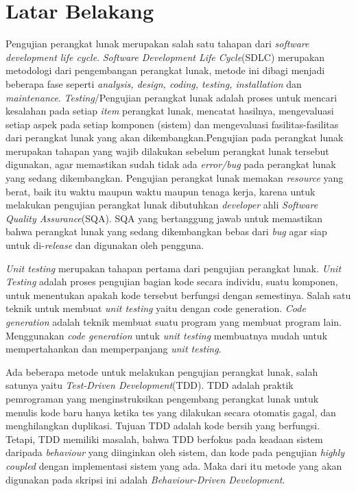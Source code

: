 \documentclass[a4paper,twoside]{article}
\begin{document}
\section{Latar Belakang}
Pengujian perangkat lunak merupakan salah satu tahapan dari \textit{software development life cycle}. \textit{Software Development Life Cycle}(SDLC) merupakan metodologi dari pengembangan perangkat lunak, metode ini dibagi menjadi beberapa fase seperti\textit{ analysis, design,  coding,  testing, installation} dan \textit{maintenance}. \textit{Testing}/Pengujian perangkat lunak adalah proses untuk mencari kesalahan pada setiap \textit{item} perangkat lunak, mencatat hasilnya, mengevaluasi setiap aspek pada setiap komponen (sistem) dan mengevaluasi fasilitas-fasilitas dari perangkat lunak yang akan dikembangkan.Pengujian pada perangkat lunak merupakan tahapan yang wajib dilakukan sebelum perangkat lunak tersebut digunakan, agar memastikan sudah tidak ada \textit{error/bug} pada perangkat lunak yang sedang dikembangkan. Pengujian perangkat lunak memakan \textit{resource} yang berat, baik itu waktu maupun waktu maupun tenaga kerja, karena untuk melakukan pengujian perangkat lunak dibutuhkan \textit{developer} ahli \textit{Software Quality Assurance}(SQA). SQA yang bertanggung jawab untuk memastikan bahwa perangkat lunak yang sedang dikembangkan bebas dari \textit{bug} agar siap untuk di-\textit{release} dan digunakan oleh pengguna.

\textit{Unit testing} merupakan tahapan pertama dari pengujian perangkat lunak. \textit{Unit Testing} adalah proses pengujian bagian kode secara individu, suatu komponen, untuk menentukan apakah kode tersebut berfungsi dengan semestinya. Salah satu teknik untuk membuat \textit{unit testing} yaitu dengan code generation. \textit{Code generation} adalah teknik membuat suatu program yang membuat program lain. Menggunakan \textit{code generation} untuk \textit{unit testing} membuatnya mudah untuk mempertahankan dan memperpanjang \textit{unit testing}.

Ada beberapa metode untuk melakukan pengujian perangkat lunak, salah satunya yaitu \textit{Test-Driven Development}(TDD). TDD adalah praktik pemrograman yang menginstruksikan pengembang perangkat lunak untuk menulis kode baru hanya ketika tes yang dilakukan secara otomatis gagal, dan menghilangkan duplikasi. Tujuan TDD adalah kode bersih yang berfungsi. Tetapi, TDD memiliki masalah, bahwa TDD berfokus pada keadaan sistem daripada \textit{behaviour} yang diinginkan oleh sistem, dan kode pada pengujian \textit{highly coupled} dengan implementasi sistem yang ada. Maka dari itu metode yang akan digunakan pada skripsi ini adalah \textit{Behaviour-Driven Development}.
\end{document}
